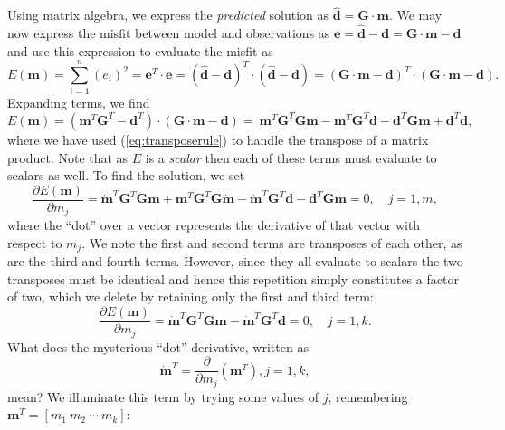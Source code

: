 Using matrix algebra, we express the \emph{predicted} solution as $\hat{\mathbf{d}} = \mathbf{G \cdot m}$.
We may now express the misfit
between model and observations as $\mathbf{e} = \hat{\mathbf{d}} - \mathbf{d} = \mathbf{G \cdot m} - \mathbf{d}$
and use this expression to evaluate the misfit as
\begin{equation}
E(\mathbf{m}) = \sum ^n _{i=1}  (e_i)^2  = \mathbf{e}^T \cdot \mathbf{e} = \left(\hat{\mathbf{d}} - \mathbf{d}\right)^T\cdot \left(\hat{\mathbf{d}} - \mathbf{d}\right) = \left(\mathbf{G \cdot m} - \mathbf{d}\right)^T \cdot \left(\mathbf{G \cdot m} - \mathbf{d}\right).
\end{equation}
Expanding terms, we find
\begin{equation}
E(\mathbf{m}) =  \left(\mathbf{m}^T\mathbf{G}^T - \mathbf{d}^T\right) \cdot \left(\mathbf{G \cdot m} - \mathbf{d}\right) = \
\mathbf{m}^T\mathbf{G}^T\mathbf{Gm} - \mathbf{m}^T\mathbf{G}^T\mathbf{d} - \mathbf{d}^T\mathbf{Gm} + \mathbf{d}^T\mathbf{d},
\end{equation}
where we have used (\ref{eq:transposerule}) to handle the transpose of a matrix product.
Note that as $E$ is a \emph{scalar} then each of these terms must evaluate to scalars as well.  To find the solution, we set
\begin{equation}
\frac{\partial E(\mathbf{m})}{\partial m_j} = \mathbf{\dot{m}}^T\mathbf{G}^T\mathbf{Gm} + \mathbf{m}^T\mathbf{G}^T\mathbf{G\dot{m}} - \mathbf{\dot{m}}^T\mathbf{G}^T\mathbf{d} - \mathbf{d}^T\mathbf{G\dot{m}} = 0, \quad j = 1,m,
\end{equation}
where the ``dot'' over a vector represents the derivative of that vector with respect to $m_j$.
We note the first and second terms are transposes of each other, as are the third and fourth terms.
However, since they all evaluate to scalars the two transposes must be identical and hence this
repetition simply constitutes a factor of two, which we delete by retaining only the first and third term:
\begin{equation}
\frac{\partial E(\mathbf{m})}{\partial m_j} = \mathbf{\dot{m}}^T\mathbf{G}^T\mathbf{Gm} - \mathbf{\dot{m}}^T\mathbf{G}^T\mathbf{d} = 0, \quad j = 1,k.
\end{equation}
What does the mysterious ``dot''-derivative, written as
\begin{equation}
\mathbf{\dot{m}}^T = \frac{\partial}{\partial m_j} \left (\mathbf{m}^T \right), j = 1,k,
\end{equation}
mean? We illuminate this term by trying some values of $j$, remembering $\mathbf{m}^T = [m_1\ m_2 \ \cdots \ m_k ]$:
